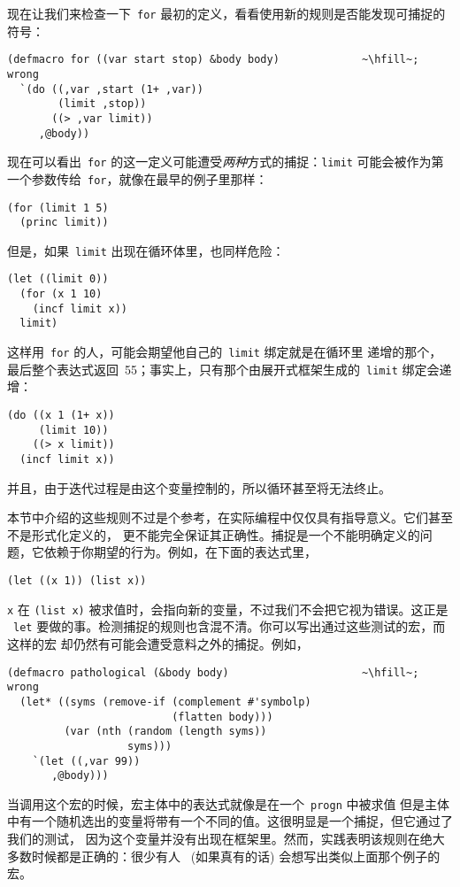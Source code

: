 现在让我们来检查一下~\texttt{for} 最初的定义，看看使用新的规则是否能发现可捕捉的符号：
\begin{lstlisting}[escapechar=\~]
(defmacro for ((var start stop) &body body)             ~\hfill~; wrong
  `(do ((,var ,start (1+ ,var))
        (limit ,stop))
       ((> ,var limit))
     ,@body))
\end{lstlisting}
现在可以看出~\texttt{for} 的这一定义可能遭受\emph{两种}方式的捕捉：\texttt{limit}
可能会被作为第一个参数传给~\texttt{for}，就像在最早的例子里那样：
\begin{lstlisting}
(for (limit 1 5)
  (princ limit))
\end{lstlisting}
但是，如果~\texttt{limit} 出现在循环体里，也同样危险：
\begin{lstlisting}
(let ((limit 0))
  (for (x 1 10)
    (incf limit x))
  limit)
\end{lstlisting}
这样用~\texttt{for} 的人，可能会期望他自己的~\texttt{limit} 绑定就是在循环里
递增的那个，最后整个表达式返回~55；事实上，只有那个由展开式框架生成的~\texttt{limit}
绑定会递增：
\begin{lstlisting}
(do ((x 1 (1+ x))
     (limit 10))
    ((> x limit))
  (incf limit x))
\end{lstlisting}
并且，由于迭代过程是由这个变量控制的，所以循环甚至将无法终止。

本节中介绍的这些规则不过是个参考，在实际编程中仅仅具有指导意义。它们甚至不是形式化定义的，
更不能完全保证其正确性。捕捉是一个不能明确定义的问题，它依赖于你期望的行为。例如，在下面的表达式里，
\begin{lstlisting}
(let ((x 1)) (list x))
\end{lstlisting}
\texttt{x} 在 \texttt{(list x)} 被求值时，会指向新的变量，不过我们不会把它视为错误。这正是
~\texttt{let} 要做的事。检测捕捉的规则也含混不清。你可以写出通过这些测试的宏，而这样的宏
却仍然有可能会遭受意料之外的捕捉。例如，
\begin{lstlisting}[escapechar=\~]
(defmacro pathological (&body body)                     ~\hfill~; wrong
  (let* ((syms (remove-if (complement #'symbolp)
                          (flatten body)))
         (var (nth (random (length syms))
                   syms)))
    `(let ((,var 99))
       ,@body)))
\end{lstlisting}
当调用这个宏的时候，宏主体中的表达式就像是在一个~\texttt{progn} 中被求值\pozhehao{}
但是主体中有一个随机选出的变量将带有一个不同的值。这很明显是一个捕捉，但它通过了我们的测试，
因为这个变量并没有出现在框架里。然而，实践表明该规则在绝大多数时候都是正确的：很少有人
~(如果真有的话) 会想写出类似上面那个例子的宏。

